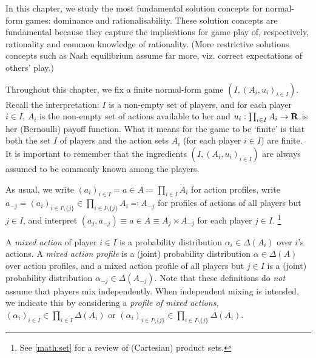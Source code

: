 




In this chapter, we study the most fundamental solution concepts for normal-form games: dominance and rationalisability. These solution concepts are fundamental because they capture the implications for game play of, respectively, rationality and common knowledge of rationality. (More restrictive solutions concepts such as Nash equilibrium assume far more, viz. correct expectations of others' play.)

Throughout this chapter, we fix a finite normal-form game $\left( I, (A_i, u_i)_{i \in I} \right)$. Recall the interpretation: $I$ is a non-empty set of players, and for each player $i \in I$, $A_i$ is the non-empty set of actions available to her and $u_i : \prod_{i \in I} A_i \to \mathbf{R}$ is her (Bernoulli) payoff function. What it means for the game to be `finite' is that both the set $I$ of players and the action sets $A_i$ (for each player $i \in I$) are finite. It is important to remember that the ingredients $\left( I, (A_i, u_i)_{i \in I} \right)$ are always assumed to be commonly known among the players.

As usual, we write $(a_i)_{i \in I} = a \in A \coloneqq \prod_{i \in I} A_i$ for action profiles, write $a_{-j} = (a_i)_{i \in I \setminus \{j\}} \in \prod_{i \in I \setminus \{j\}} A_i \eqqcolon A_{-j}$ for profiles of actions of all players but $j \in I$, and interpret $(a_j,a_{-j}) \equiv a \in A \equiv A_j \times A_{-j}$ for each player $j \in I$.%
	\footnote{See \cref{math:set} for a review of (Cartesian) product sets.}

A \emph{mixed action} of player $i \in I$ is a probability distribution $\alpha_i \in \Delta(A_i)$ over $i$'s actions. A \emph{mixed action profile} is a (joint) probability distribution $\alpha \in \Delta(A)$ over action profiles, and a mixed action profile of all players but $j \in I$ is a (joint) probability distribution $\alpha_{-j} \in \Delta(A_{-j})$. Note that these definitions do \emph{not} assume that players mix independently. When independent mixing is intended, we indicate this by considering a \emph{profile of mixed actions,} $(\alpha_i)_{i \in I} \in \prod_{i \in I} \Delta(A_i)$ or $(\alpha_i)_{i \in I \setminus \{j\}} \in \prod_{i \in I \setminus \{j\}} \Delta(A_i)$.

